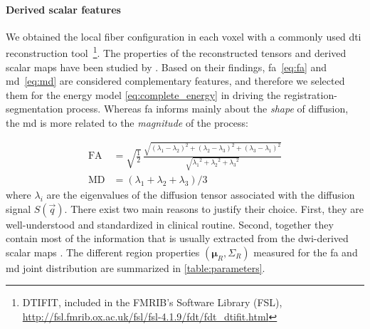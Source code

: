 \paragraph{Derived scalar features}
We obtained the local fiber configuration in each voxel with a commonly 
used \gls{dti} reconstruction tool~\footnote{DTIFIT, included
in the FMRIB's Software Library (FSL), 
\url{http://fsl.fmrib.ox.ac.uk/fsl/fsl-4.1.9/fdt/fdt_dtifit.html}}. 
The properties of the reconstructed tensors and derived scalar maps have
been studied by \cite{ennis_orthogonal_2006}. Based on their
findings, \gls{fa}~\eqref{eq:fa} and \gls{md}~\eqref{eq:md} are
considered complementary features, and therefore we selected them for the 
energy model \eqref{eq:complete_energy} in driving the 
registration-segmentation process. 
Whereas \gls{fa} informs mainly about the \emph{shape} of diffusion, 
the \gls{md} is more related to the \emph{magnitude} of the process:

\begin{align}
\mathrm{FA} &= \sqrt{ \frac{1}{2}}\,\frac{\sqrt{ (\lambda_1 - \lambda_2)^2 + (\lambda_2 - \lambda_3)^2 + (\lambda_3 - \lambda_1)^2}}{\sqrt{ {\lambda_1}^2 + {\lambda_2}^2 + {\lambda_3}^2}} \label{eq:fa} \\
\mathrm{MD} &= ( \lambda_1 + \lambda_2 + \lambda_3 ) / 3 \label{eq:md}
\end{align}
where $\lambda_i$ are the eigenvalues of the diffusion tensor 
associated with the diffusion signal $S(\vec{q})$. There exist 
two main reasons to justify their choice. 
First, they are well-understood and standardized in clinical routine.
Second, together they contain most of the information that is
usually extracted from the \gls{dwi}-derived scalar maps
\cite{ennis_orthogonal_2006}. The different region properties 
$(\mathbf{\mu}_R,\Sigma_R)$ measured for the \gls{fa} and \gls{md}
joint distribution are summarized in \autoref{table:parameters}. \\ 

